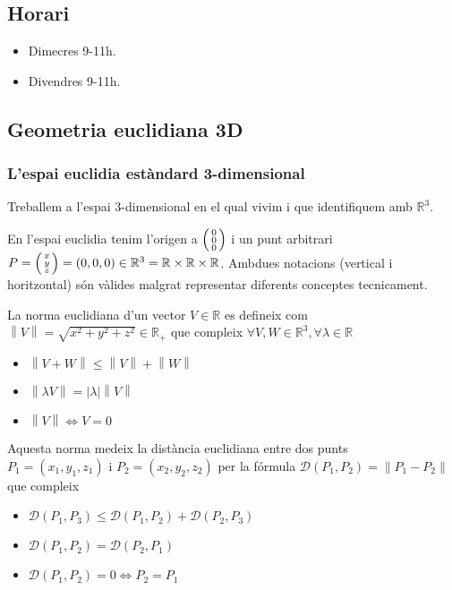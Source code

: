 \documentclass[../main.tex]{subfiles}
\begin{document}
\subsection*{Horari}
\begin{itemize}
    \item Dimecres 9-11h.
    \item Divendres 9-11h.
\end{itemize}
\subsection{Geometria euclidiana 3D}
\subsubsection{L'espai euclidia estàndard 3-dimensional}
Treballem a l'espai 3-dimensional en el qual vivim i que identifiquem amb $\mathbb{R}^3$.
\begin{notacio}
    En l'espai euclidia tenim l'origen a $\begin{psmallmatrix}0\\0\\0\end{psmallmatrix}$ i un punt
    arbitrari $P = \begin{psmallmatrix}x\\y\\z\end{psmallmatrix} = \left(0,0,0\right) \in \mathbb{R}^3 = \mathbb{R} \times \mathbb{R} \times \mathbb{R}$. 
    Ambdues notacions (vertical i horitzontal) són vàlides malgrat representar diferents conceptes
    tecnicament.
\end{notacio}
\begin{definicio}
    La norma euclidiana d'un vector $V \in \mathbb{R}$ es defineix com $\left\lVert V\right\rVert = \sqrt{x^2+y^2+z^2} \in \mathbb{R}_+$
    que compleix $\forall V, W \in \mathbb{R}^3, \forall \lambda \in \mathbb{R}$
    \begin{itemize}
        \item $\left\lVert V+W\right\rVert \leq \left\lVert V\right\rVert + \left\lVert W\right\rVert$
        \item $\left\lVert \lambda V\right\rVert = \left\lvert \lambda\right\rvert\left\lVert V\right\rVert$
        \item $\left\lVert V\right\rVert\iff V = 0$
    \end{itemize}
    Aquesta norma medeix la distància euclidiana entre dos punts $P_1 = (x_1, y_1, z_1)\text{ i }P_2 = (x_2, y_2, z_2)$ 
    per la fórmula 
    $\mathcal{D}\left(P_1, P_2\right) = \left\lVert P_1 - P_2\right\rVert$ que compleix
    \begin{itemize}
        \item $\mathcal{D}\left(P_1, P_3\right) \leq \mathcal{D}\left(P_1, P_2\right) + \mathcal{D}\left(P_2, P_3\right)$
        \item $\mathcal{D}\left(P_1, P_2\right) = \mathcal{D}\left(P_2, P_1\right)$
        \item $\mathcal{D}\left(P_1, P_2\right) = 0 \iff P_2 = P_1$
    \end{itemize}
\end{definicio}
\end{document}
